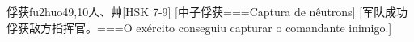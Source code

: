 \begin{EntryWithPhonetic}{俘获}{fu2huo4}{9,10}{⼈、⾋}[HSK 7-9]
  [中子俘获===Captura de nêutrons]
  [军队成功俘获敌方指挥官。===O exército conseguiu capturar o comandante inimigo.]
\end{EntryWithPhonetic}
